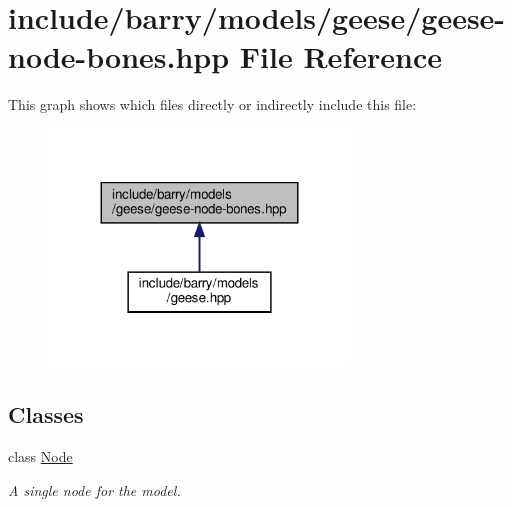 \hypertarget{geese-node-bones_8hpp}{}\section{include/barry/models/geese/geese-\/node-\/bones.hpp File Reference}
\label{geese-node-bones_8hpp}
This graph shows which files directly or indirectly include this file\+:\nopagebreak
\begin{figure}[H]
\begin{center}
\leavevmode
\includegraphics[width=227pt]{geese-node-bones_8hpp__dep__incl}
\end{center}
\end{figure}
\subsection*{Classes}
\begin{DoxyCompactItemize}
\item 
class \hyperlink{class_node}{Node}
\begin{DoxyCompactList}\small\item\em A single node for the model. \end{DoxyCompactList}\end{DoxyCompactItemize}
